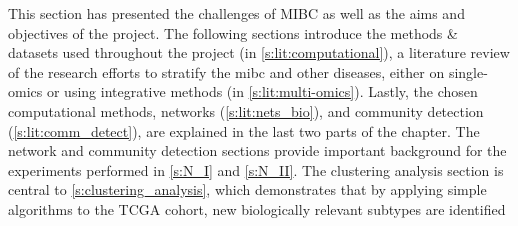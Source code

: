 This section has presented the challenges of MIBC as well as the aims and objectives of the project. The following sections introduce the methods \& datasets used throughout the project (in \cref{s:lit:computational}), a literature review of the research efforts to stratify the \acrshort{mibc} and other diseases, either on single-omics or using integrative methods (in \cref{s:lit:multi-omics}). Lastly, the chosen computational methods, networks (\cref{s:lit:nets_bio}), and community detection (\cref{s:lit:comm_detect}), are explained in the last two parts of the chapter. The network and community detection sections provide important background for the experiments performed in \cref{s:N_I} and \cref{s:N_II}. The clustering analysis section is central to \cref{s:clustering_analysis}, which demonstrates that by applying simple algorithms to the TCGA cohort, new biologically relevant subtypes are identified